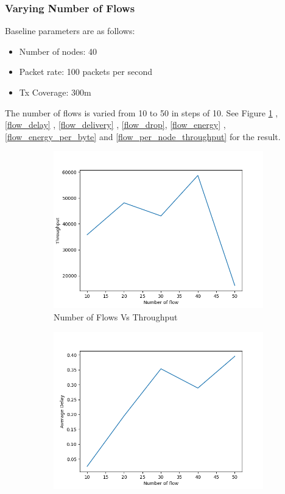 \subsubsection{Varying Number of Flows}
Baseline parameters are as follows:
\begin{itemize}
    \item Number of nodes: 40
    \item Packet rate: 100 packets per second
    \item Tx Coverage: 300m
\end{itemize}
The number of flows is varied from 10 to 50 in steps of 10.
See Figure \ref{flow_throughput} ,\ref{flow_delay} , \ref{flow_delivery} , \ref{flow_drop}, \ref{flow_energy} , \ref{flow_energy_per_byte} and \ref{flow_per_node_throughput} for the result.
\begin{figure}[h]
\begin{subfigure}{.5\textwidth}
  \centering
  \includegraphics[width=.8\linewidth]{_15_4_static/NumberofFlowvsThroughput.png}
     \caption{Number of Flows Vs Throughput}
    \label{flow_throughput}
\end{subfigure}
\begin{subfigure}{.5\textwidth}
  \centering
  \includegraphics[width=.8\linewidth]{_15_4_static/NumberofFlowvsAverageDelay.png}

\end{subfigure}
\end{figure}
